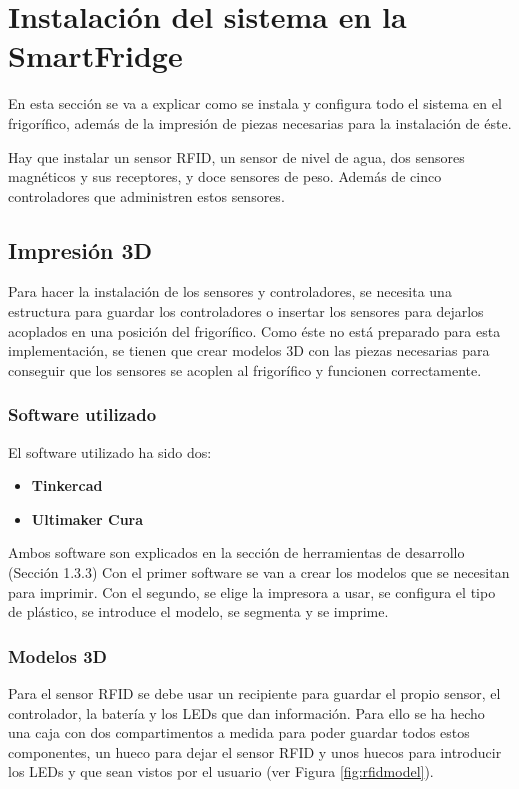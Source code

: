 \chapter{Instalación del sistema en la SmartFridge}
En esta sección se va a explicar como se instala y configura todo el sistema en el frigorífico, además de la impresión de piezas necesarias para la instalación de éste.

Hay que instalar un sensor RFID, un sensor de nivel de agua, dos sensores magnéticos y sus receptores, y doce sensores de peso. Además de cinco controladores que administren estos sensores.

\section{Impresión 3D}
Para hacer la instalación de los sensores y controladores, se necesita una estructura para guardar los controladores o insertar los sensores para dejarlos acoplados en una posición del frigorífico. Como éste no está preparado para esta implementación, se tienen que crear modelos 3D con las piezas necesarias para conseguir que los sensores se acoplen al frigorífico y funcionen correctamente.

\subsection{Software utilizado}
El software utilizado ha sido dos:

\begin{itemize}
    \item \textbf{Tinkercad}
    \item \textbf{Ultimaker Cura}
\end{itemize}

Ambos software son explicados en la sección de herramientas de desarrollo (Sección 1.3.3) Con el primer software se van a crear los modelos que se necesitan para imprimir. Con el segundo, se elige la impresora a usar, se configura el tipo de plástico, se introduce el modelo, se segmenta y se imprime.

\subsection{Modelos 3D}
Para el sensor RFID se debe usar un recipiente para guardar el propio sensor, el controlador, la batería y los LEDs que dan información. Para ello se ha hecho una caja con dos compartimentos a medida para poder guardar todos estos componentes, un hueco para dejar el sensor RFID y unos huecos para introducir los LEDs y que sean vistos por el usuario (ver Figura \ref{fig:rfidmodel}).

